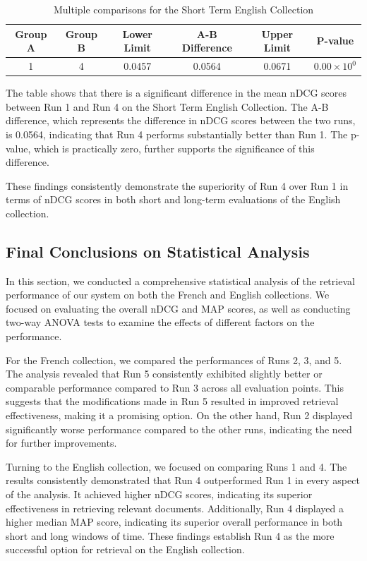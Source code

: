 \begin{table}[!h]
\centering
\caption{Multiple comparisons for the Short Term English Collection}
\label{table:st_anova_eng}
\begin{tabular}{cccccc}
\hline
Group A & Group B & Lower Limit & A-B Difference & Upper Limit & P-value \\
\hline
1 & 4 & 0.0457 & 0.0564 & 0.0671 & $0.00 \times 10^{0}$ \\
\hline
\end{tabular}
\end{table}

The table shows that there is a significant difference in the mean \ac{nDCG} scores between Run 1 and Run 4 on the Short Term English Collection. 
The A-B difference, which represents the difference in \ac{nDCG} scores between the two runs, is 0.0564, indicating that Run 4 performs substantially better than Run 1. 
The p-value, which is practically zero, further supports the significance of this difference.

These findings consistently demonstrate the superiority of Run 4 over Run 1 in terms of \ac{nDCG} scores in both short and long-term evaluations of the English collection.


\enlargethispage{4\baselineskip}
\subsection{Final Conclusions on Statistical Analysis}

In this section, we conducted a comprehensive statistical analysis of the retrieval performance of our system on both the French and English collections. 
We focused on evaluating the overall \ac{nDCG} and \ac{MAP} scores, as well as conducting two-way \ac{ANOVA} tests to examine the effects of different factors on the performance.

For the French collection, we compared the performances of Runs 2, 3, and 5. 
The analysis revealed that Run 5 consistently exhibited slightly better or comparable performance compared to Run 3 across all evaluation points. 
This suggests that the modifications made in Run 5 resulted in improved retrieval effectiveness, making it a promising option. 
On the other hand, Run 2 displayed significantly worse performance compared to the other runs, indicating the need for further improvements.

Turning to the English collection, we focused on comparing Runs 1 and 4. 
The results consistently demonstrated that Run 4 outperformed Run 1 in every aspect of the analysis. 
It achieved higher \ac{nDCG} scores, indicating its superior effectiveness in retrieving relevant documents. 
Additionally, Run 4 displayed a higher median \ac{MAP} score, indicating its superior overall performance in both short and long windows of time. 
These findings establish Run 4 as the more successful option for retrieval on the English collection.

